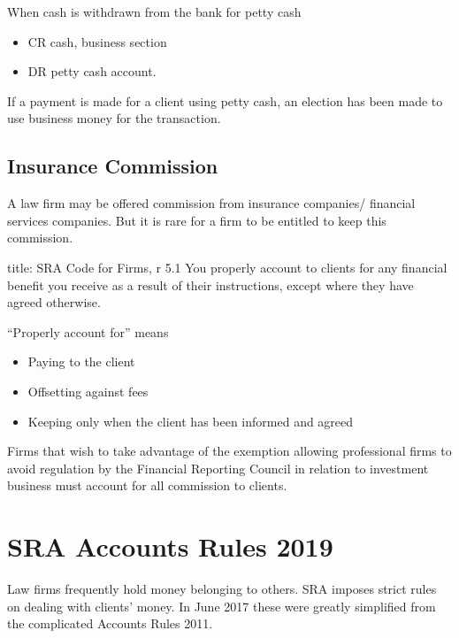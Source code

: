 \documentclass[
]{article}
\newenvironment{Shaded}{}{}
\newcommand{\NormalTok}[1]{#1}
\providecommand{\tightlist}{%
  \setlength{\itemsep}{0pt}\setlength{\parskip}{0pt}}
\begin{document}
When cash is withdrawn from the bank for petty cash

\begin{itemize}
\tightlist
\item
  CR cash, business section
\item
  DR petty cash account.
\end{itemize}

If a payment is made for a client using petty cash, an election has been
made to use business money for the transaction.

\hypertarget{insurance-commission}{%
\subsection{Insurance Commission}\label{insurance-commission}}

A law firm may be offered commission from insurance companies/ financial
services companies. But it is rare for a firm to be entitled to keep
this commission.

\begin{Shaded}
\begin{Highlighting}[]
\NormalTok{title: SRA Code for Firms, r 5.1}
\NormalTok{You properly account to clients for any financial benefit you receive as a result of their instructions, except where they have agreed otherwise.}
\end{Highlighting}
\end{Shaded}

``Properly account for'' means

\begin{itemize}
\tightlist
\item
  Paying to the client
\item
  Offsetting against fees
\item
  Keeping only when the client has been informed and agreed
\end{itemize}

Firms that wish to take advantage of the exemption allowing professional
firms to avoid regulation by the Financial Reporting Council in relation
to investment business must account for all commission to clients.

\hypertarget{sra-accounts-rules-2019}{%
\section{SRA Accounts Rules 2019}\label{sra-accounts-rules-2019}}

Law firms frequently hold money belonging to others. SRA imposes strict
rules on dealing with clients' money. In June 2017 these were greatly
simplified from the complicated Accounts Rules 2011.
\end{document}
